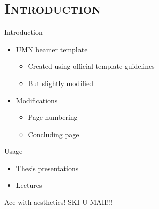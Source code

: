 \documentclass[xcolor=x11names,compress,aspectratio=169]{beamer}
\begin{document}
\section{\scshape Introduction}
\begin{frame}{Introduction}
\begin{itemize}
\setlength\itemsep{0.5em}
    \item UMN beamer template 
    \vspace{0.5em}
        \begin{itemize}
        \setlength\itemsep{0.5em}
            \item Created using official template guidelines
            \item But slightly modified
        \end{itemize}
    \vspace{0.5em}
    \item Modifications
    \vspace{0.5em}
    \begin{itemize}
    \setlength\itemsep{0.5em}
        \item Page numbering
        \item Concluding page
    \end{itemize}
\end{itemize}
\end{frame}
\begin{frame}{Usage}
    \begin{itemize}
    \setlength\itemsep{0.5em}
        \item Thesis presentations
        \item Lectures
    \end{itemize}
    \vspace{0.2cm}
    \textcolor{GopherDarkMaroon}{Ace with aesthetics! SKI-U-MAH!!!}
    \vspace{-0.5cm}
\end{frame}
\end{document}
